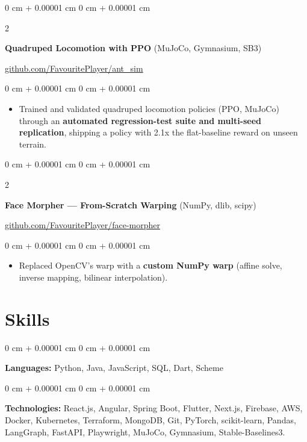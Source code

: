 \documentclass[10pt, letterpaper]{article}
\newenvironment{highlights}{
    \begin{itemize}[
        topsep=0.3 cm,
        parsep=0.09 cm,
        partopsep=0pt,
        itemsep=0.05 cm,
        leftmargin=0 cm + 10pt
    ]
}{
    \end{itemize}
} %
\newenvironment{onecolentry}{
    \begin{adjustwidth}{
        0 cm + 0.00001 cm
    }{
        0 cm + 0.00001 cm
    }
}{
    \end{adjustwidth}
} %
\newenvironment{extendedtwocolentry}[2][]{
    \onecolentry
    \def\secondColumn{#2}
    \setcolumnwidth{\fill, 8 cm}
    \begin{paracol}{2}
}{
    \switchcolumn \raggedleft \secondColumn
    \end{paracol}
    \endonecolentry
}
\begin{document}
        \begin{extendedtwocolentry}{
            \href{https://github.com/FavouritePlayer/ant_sim}{github.com/FavouritePlayer/ant\_sim}
        }
            \textbf{Quadruped Locomotion with PPO} (MuJoCo, Gymnasium, SB3)
        \end{extendedtwocolentry}

        \vspace{0.11 cm}
        \begin{onecolentry}
            \begin{highlights}
                \item Trained and validated quadruped locomotion policies (PPO, MuJoCo) through an \textbf{automated regression-test suite and multi-seed replication}, shipping a policy with 2.1x the flat-baseline reward on unseen terrain.
            \end{highlights}
        \end{onecolentry}

        \begin{extendedtwocolentry}{
            \href{https://github.com/FavouritePlayer/face-morpher}{github.com/FavouritePlayer/face-morpher}
        }
            \textbf{Face Morpher — From-Scratch Warping} (NumPy, dlib, scipy)
        \end{extendedtwocolentry}

        \vspace{0.11 cm}
        \begin{onecolentry}
            \begin{highlights}
                \item Replaced OpenCV's warp with a \textbf{custom NumPy warp} (affine solve, inverse mapping, bilinear interpolation).
            \end{highlights}
        \end{onecolentry}

    \section{Skills}

        \begin{onecolentry}
            \textbf{Languages:} Python, Java, JavaScript, SQL, Dart, Scheme
        \end{onecolentry}

        \vspace{0.11 cm}

        \begin{onecolentry}
            \textbf{Technologies:} React.js, Angular, Spring Boot, Flutter, Next.js, Firebase, AWS, Docker, Kubernetes, Terraform, MongoDB, Git, PyTorch, scikit-learn, Pandas, LangGraph, FastAPI, Playwright, MuJoCo, Gymnasium, Stable-Baselines3.
        \end{onecolentry}
\end{document}
